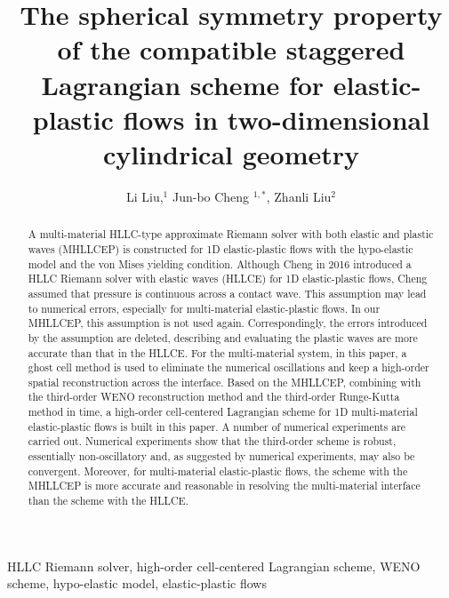 \documentclass[review]{elsarticle}
\begin{document}
\begin{frontmatter}

\title{The spherical  symmetry property of the compatible staggered Lagrangian scheme for elastic-plastic flows in two-dimensional cylindrical geometry}

\author{Li Liu,$^1$ Jun-bo Cheng $^{1,*}$, Zhanli Liu$^2$}


\address{$^1$  Institute of Applied Physics and Computational Mathematics, Beijing 100094, China }
\address{$^2$  Applied Mechanics Laboratory, Department of Engineering Mechanics, School of Aerospace, Tsinghua University, Beijing, China }

\begin{abstract}
  A multi-material HLLC-type  approximate Riemann solver with both elastic and plastic waves (MHLLCEP) is constructed for 1D elastic-plastic flows with the  hypo-elastic model and the von Mises yielding condition. Although Cheng in 2016 \cite{cheng2016harten} introduced a HLLC Riemann solver with elastic waves (HLLCE) for 1D elastic-plastic flows, Cheng assumed that pressure is continuous across a  contact wave. This assumption may lead to numerical errors, especially for multi-material elastic-plastic flows. In our MHLLCEP, this assumption is not used again. Correspondingly, the errors introduced by the assumption are deleted, describing and evaluating the plastic waves are more accurate than that in the HLLCE.  For  the multi-material system, in this paper, a ghost cell method is used to eliminate the  numerical oscillations  and keep a high-order spatial reconstruction across the interface. Based on the MHLLCEP, combining with the third-order WENO reconstruction method and the third-order Runge-Kutta method in time, a high-order cell-centered Lagrangian scheme for 1D multi-material elastic-plastic flows is built in this paper. A number of numerical experiments are carried out. Numerical experiments show that the third-order scheme is robust, essentially non-oscillatory and, as suggested by numerical experiments, may also be convergent. Moreover, for multi-material elastic-plastic flows, the scheme with  the MHLLCEP is more accurate and reasonable in resolving the multi-material interface than the scheme with the  HLLCE.
\end{abstract}

\begin{keyword}
  HLLC Riemann solver, high-order cell-centered Lagrangian scheme,  WENO scheme,  hypo-elastic model, elastic-plastic flows
\end{keyword}

\end{frontmatter}
\end{document}
